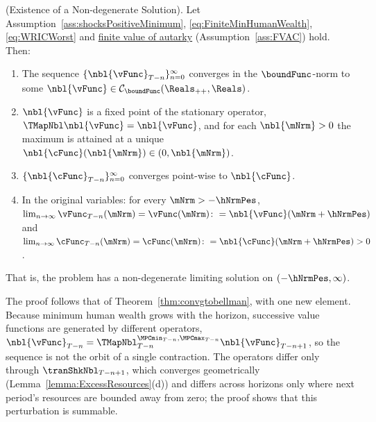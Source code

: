 \documentclass[\econtexRoot/BufferStockTheory]{subfiles}
\begin{document}
\begin{theorem}(Existence of a Non-degenerate Solution).\label{thm:existencePositiveMinimum}
Let Assumption~\ref{ass:shocksPositiveMinimum}, \eqref{eq:FiniteMinHumanWealth}, \eqref{eq:WRICWorst} and \hyperlink{FVAC}{finite value of autarky} (Assumption~\ref{ass:FVAC}) hold.
Then:
\begin{enumerate}[label=(\roman*)]
\item The sequence $\{\nbl{\vFunc}_{T-n}\}_{n=0}^{\infty}$ converges in the $\boundFunc$-norm to some $\nbl{\vFunc}\in\mathcal{C}_{\boundFunc}(\Reals_{++},\Reals)$.
\item $\nbl{\vFunc}$ is a fixed point of the stationary operator, $\TMapNbl\nbl{\vFunc}=\nbl{\vFunc}$, and for each $\nbl{\mNrm}>0$ the maximum is attained at a unique $\nbl{\cFunc}(\nbl{\mNrm})\in(0,\nbl{\mNrm})$.
\item $\{\nbl{\cFunc}_{T-n}\}_{n=0}^{\infty}$ converges point-wise to $\nbl{\cFunc}$.
\item In the original variables: for every $\mNrm>-\hNrmPes$,
$\lim_{n\rightarrow\infty}\vFunc_{T-n}(\mNrm)=\vFunc(\mNrm)\colon=\nbl{\vFunc}(\mNrm+\hNrmPes)$ and $\lim_{n\rightarrow\infty}\cFunc_{T-n}(\mNrm)=\cFunc(\mNrm)\colon=\nbl{\cFunc}(\mNrm+\hNrmPes)>0$.
\end{enumerate}
That is, the problem has a non-degenerate limiting solution on $(-\hNrmPes,\infty)$.
\end{theorem}

The proof follows that of Theorem~\ref{thm:convgtobellman}, with one new element.
Because minimum human wealth grows with the horizon, successive value functions are generated by different operators, $\nbl{\vFunc}_{T-n}=\TMapNbl_{T-n}^{\MPCmin_{T-n},\MPCmax_{T-n}}\nbl{\vFunc}_{T-n+1}$, so the sequence is not the orbit of a single contraction.
The operators differ only through $\tranShkNbl_{T-n+1}$, which converges geometrically (Lemma~\ref{lemma:ExcessResources}(d)) and differs across horizons only where next period's resources are bounded away from zero; the proof shows that this perturbation is summable.
\end{document}
